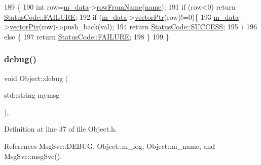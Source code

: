 \begin{DoxyCode}
189                                                  \{
190     \textcolor{keywordtype}{int} row=\hyperlink{classProcessus_a3da9a9de8af54e2f47807a3e09dfccff}{m\_data}->\hyperlink{classData_a72f9afe0edb22ad39871292f9f4d3d38}{rowFromName}(\hyperlink{classObject_a300f4c05dd468c7bb8b3c968868443c1}{name});
191     \textcolor{keywordflow}{if} (row<0) \textcolor{keywordflow}{return} \hyperlink{classStatusCode_a6f565cbeadc76d14c72f047e5e85eb4ba3da73d4c469762eb9d3c960368252b26}{StatusCode::FAILURE};
192     \textcolor{keywordflow}{if} (\hyperlink{classProcessus_a3da9a9de8af54e2f47807a3e09dfccff}{m\_data}->\hyperlink{classData_aa2153cb57f6f1a67b54eafe5582e0b6b}{vectorPtr}(row)!=0)\{
193       \hyperlink{classProcessus_a3da9a9de8af54e2f47807a3e09dfccff}{m\_data}->\hyperlink{classData_aa2153cb57f6f1a67b54eafe5582e0b6b}{vectorPtr}(row)->push\_back(val);
194       \textcolor{keywordflow}{return} \hyperlink{classStatusCode_a6f565cbeadc76d14c72f047e5e85eb4badd0da38d3ba0d922efd1f4619bc37ad8}{StatusCode::SUCCESS};
195     \}
196     \textcolor{keywordflow}{else} \{
197       \textcolor{keywordflow}{return} \hyperlink{classStatusCode_a6f565cbeadc76d14c72f047e5e85eb4ba3da73d4c469762eb9d3c960368252b26}{StatusCode::FAILURE};
198     \}
199   \}
\end{DoxyCode}
\mbox{\label{classObject_aac010553f022165573714b7014a15f0d}} 
\subsubsection{\texorpdfstring{debug()}{debug()}\hspace{0.1cm}{\footnotesize\ttfamily [1/2]}}
{\footnotesize\ttfamily void Object\+::debug (\begin{DoxyParamCaption}\item[{std\+::string}]{mymsg }\end{DoxyParamCaption})\hspace{0.3cm}{\ttfamily [inline]}, {\ttfamily [inherited]}}



Definition at line 37 of file Object.\+h.



References Msg\+Svc\+::\+D\+E\+B\+UG, Object\+::m\+\_\+log, Object\+::m\+\_\+name, and Msg\+Svc\+::msg\+Svc().



